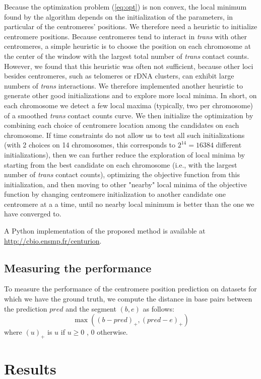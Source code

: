 Because the optimization problem (\ref{eq:opt}) is non convex, the local minimum
found by the algorithm depends on the initialization of the parameters, in
particular of the centromeres' positions. We therefore need a heuristic
to initialize centromere positions. Because centromeres tend to interact
in \textit{trans} with other centromeres, a simple heuristic is to choose the position on each chromosome at the
center of the window with the largest total number of \textit{trans} contact
counts. However, we found that this heuristic was often not sufficient, because other loci besides
centromeres, such as
telomeres or rDNA clusters, can exhibit large numbers of \textit{trans} interactions. We therefore implemented another heuristic to
generate other good initializations and to explore more local minima. In
short, on each chromosome we detect a few local maxima (typically, two per
chromosome) of a smoothed \textit{trans} contact counts curve. We then initialize the
optimization by combining each choice of centromere location among the
candidates on each chromosome. If time constraints do not allow us to test all
such initializations (with 2 choices on 14 chromosomes, this corresponds to
$2^{14}=16384$ different initializations), then we can further reduce the
exploration of local minima by starting from the best candidate on each
chromosome (i.e., with the largest number of \textit{trans} contact counts),
optimizing the objective function from this initialization, and then moving to
other "nearby" local minima of the objective function by changing centromere
initialization to another candidate one centromere at a a time, until no
nearby local minimum is better than the one we have converged to.

A Python implementation of the proposed method is available at
\href{http://cbio.ensmp.fr/centurion}{http://cbio.ensmp.fr/centurion}.

\subsection{Measuring the performance}

To measure the performance of the centromere position prediction on datasets
for which we have the
ground truth, we compute the distance in base pairs between the
prediction $pred$ and the segment $(b, e)$ as follows:
$$
\max\left( (b-pred)_+ , (pred - e)_+\right)
$$
where $(u)_+$ is $u$ if $u\geq 0$ , $0$ otherwise.



\section{Results}


